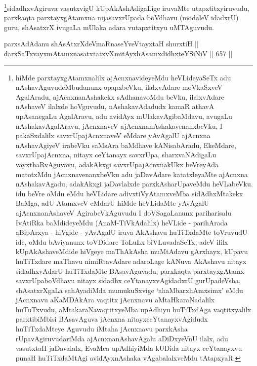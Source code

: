 \begin{artha}
\footnote{hiMde parxtayxgAtamxnalilx ajAcnxnavideyeMdu heVLideyaSeTx
adu nAshavAguvudeMbudanunx opapxbeVku, ilalxvAdare moVkaSxveV
AgalAradu, ajAcnxnanAshakekx sAdhanavoMdu beVku, ilalxvAdare
nAshaveV ilalxde hoVguvudu, nAshakavAdadudx kamaR athavA upAsanegaLu
AgalAravu, adu avidAyx mUlakavAgibaMdavu, avugaLu nAshakavAgalAravu,
jAcnxnaveV ajAcnxnanAshakavenanxbeVku, I pakaSxdalilx
savxrUpajAcnxnaveV eMdare yAvAgalU ajAcnxna nAshavAgiyeV irabeVku
saMsAra baMdhave kANisabAradu, EkeMdare, savxrUpajAcnxna, nitayx
ceYtanayx savxrUpa, sharxvaNAdigaLu vayxthaRvAguvavu, adakAkxgi
savxrUpajAcnxnakUkx beVreyAda matotxMdu jAcnxnavenanxbeVku adu
jaDavAdare katatxleyaMte ajAcnxna nAshakavAgadu, adakAkxgi
jaDavlalxde parxkAsharUpaveMdu heVLabeVku. idu beVre oMdu eMdu
heVLidare adivxtiVyAtamxveMba sidAdhxMtakekx BaMga, adU AtamxveV
eMdarU hiMde heVLidaMte yAvAgalU ajAcnxnanAshaveV AgirabeVkAguvudu
I doVSagaLanunx pariharisalu  IvAtiRka baMdideyeMdu
(AnaM-TiVkAdalilx) heVLide - parihArada aBipArxya - hiVgide -
yAvAgalU iruva AkAshavu huTiTxdaMte toVruvudU ide, oMdu bAviyanunx
toVDidare ToLuLx biVLuvadaSeTx, adeV ililx kUpAkAshaveMdide hiVgeye
maThAkAsha muMtAdavu gArxhayx, kUpavu huTiTxdare maThavu
nimiRtavAdare adaroLage kANuva AkAshavu nitayx sidadhxvAdarU
huTiTxdaMte BAsavAguvadu, parxkaqta parxtayxgAtamx savxrUpaboVdhavu
nitayx sidadhx ceYtanayxvAgidadxrU gurUpadeVsha, shAsatxrXgaLa
sahAyadiMda mumukuSxvige `ahaMbarxhAmxsimx' eMdu jAcnxnavu
aKaMDAkAra vaqtitx jAcnxnavu aMtaHkaraNadalilx huTuTxvudu,
aMtakaraNavaqtitxyeMba upAdhiyu huTiTxdAga vaqtitxyalilx
parxtibiMbisi BAsavAguva jAcnxna nitayxceYtanayxvAgidudx
huTiTxdaMteye Aguvudu iMtaha jAcnxnavu parxkAsha rUpavAgiruvudariMda
ajAcnxnanAshavAgalu aDiDxyeVnU ilalx, adu vasutxtaH jaDavalalx, EvaMca
upAdhiyiMda kUDida nitayx ceYtanayxvu punaH huTiTxdaMtAgi
avidAyxnAshaka vAgabalalxveMdu tAtapxyaR.}sidadhxvAgiruva vasutxvigU kUpAkAshAdigaLige iruvaMte
utapxtitxyiruvudu, parxkaqta parxtayxgAtamxna nijasavxrUpada boVdhavu
(modaleV idadxrU) guru, shAsatxrX ivugaLa mUlaka adara vutapxtitxyu
uMTAguvudu.
\end{artha}


\begin{shl}
parxsAdAdanu shAsAtxrXdeVmaRnaseYveVtayxtaH shurxtiH || \\
darxSaTxvayxmAtamxnasatxtatxvXmitAyxhAsamxdidhxteYSiNiV \hfill || 657 ||  
\end{shl}

